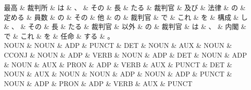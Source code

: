 \documentclass[tikz,border=5pt]{standalone}
\begin{document}
\small
\begin{dependency}[edge unit distance=12.0pt]
    \begin{deptext}[column sep=0.5em]
        最高 \& 裁判所 \& は \& 、 \& その \& 長 \& たる \& 裁判官 \& 及び \& 法律 \& の \& 定める \& 員数 \& の \& その \& 他 \& の \& 裁判官 \& で \& これ \& を \& 構成 \& し \& 、 \& その \& 長 \& たる \& 裁判官 \& 以外 \& の \& 裁判官 \& は \& 、 \& 内閣 \& で \& これ \& を \& 任命 \& する \& 。\\
        NOUN \& NOUN \& ADP \& PUNCT \& DET \& NOUN \& AUX \& NOUN \& CCONJ \& NOUN \& ADP \& VERB \& NOUN \& ADP \& DET \& NOUN \& ADP \& NOUN \& AUX \& PRON \& ADP \& VERB \& AUX \& PUNCT \& DET \& NOUN \& AUX \& NOUN \& NOUN \& ADP \& NOUN \& ADP \& PUNCT \& NOUN \& ADP \& PRON \& ADP \& VERB \& AUX \& PUNCT\\
    \end{deptext}
\end{dependency}
\end{document}
